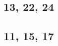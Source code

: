 \documentclass[11pt]{article}
\begin{document}
\subsection{13, 22, 24}
\begin{flushleft}












\hrulefill

\newpage
\end{flushleft}
\subsection{11, 15, 17}
\begin{flushleft}












\hrulefill
\end{flushleft}
\end{document}
